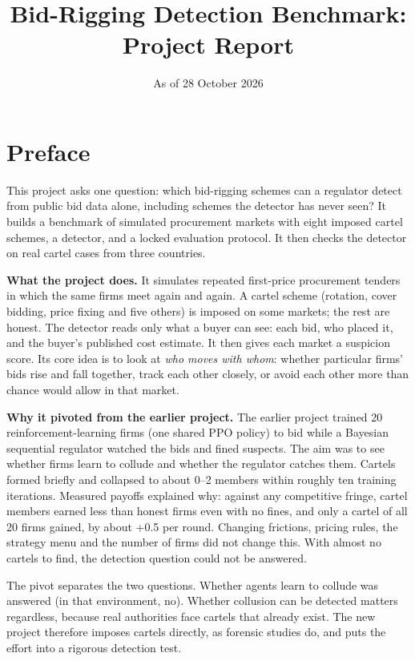 \documentclass[11pt,a4paper]{article}
\title{\bfseries Bid-Rigging Detection Benchmark:\\Project Report}
\author{}
\date{As of 28 October 2026}
\begin{document}
\maketitle
\thispagestyle{empty}

\section*{Preface}

This project asks one question: which bid-rigging schemes can a regulator detect from public bid data alone, including schemes the detector has never seen? It builds a benchmark of simulated procurement markets with eight imposed cartel schemes, a detector, and a locked evaluation protocol. It then checks the detector on real cartel cases from three countries.

\textbf{What the project does.} It simulates repeated first-price procurement tenders in which the same firms meet again and again. A cartel scheme (rotation, cover bidding, price fixing and five others) is imposed on some markets; the rest are honest. The detector reads only what a buyer can see: each bid, who placed it, and the buyer's published cost estimate. It then gives each market a suspicion score. Its core idea is to look at \emph{who moves with whom}: whether particular firms' bids rise and fall together, track each other closely, or avoid each other more than chance would allow in that market.

\textbf{Why it pivoted from the earlier project.} The earlier project trained 20 reinforcement-learning firms (one shared PPO policy) to bid while a Bayesian sequential regulator watched the bids and fined suspects. The aim was to see whether firms learn to collude and whether the regulator catches them. Cartels formed briefly and collapsed to about 0--2 members within roughly ten training iterations. Measured payoffs explained why: against any competitive fringe, cartel members earned less than honest firms even with no fines, and only a cartel of all 20 firms gained, by about +0.5 per round. Changing frictions, pricing rules, the strategy menu and the number of firms did not change this. With almost no cartels to find, the detection question could not be answered.

The pivot separates the two questions. Whether agents learn to collude was answered (in that environment, no). Whether collusion can be detected matters regardless, because real authorities face cartels that already exist. The new project therefore imposes cartels directly, as forensic studies do, and puts the effort into a rigorous detection test.
\end{document}
